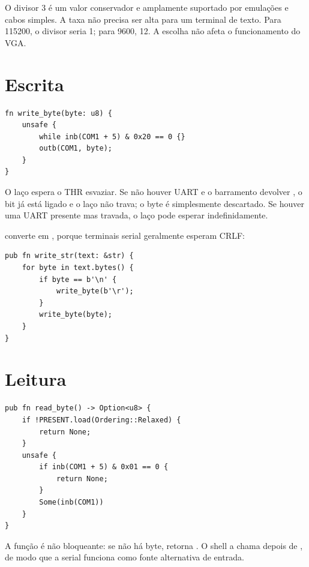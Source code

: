 \begin{nota}
O divisor 3 \'e um valor conservador e amplamente suportado por emula\c{c}\~oes
e cabos simples. A taxa n\~ao precisa ser alta para um terminal de texto.
Para 115200, o divisor seria 1; para 9600, 12. A escolha n\~ao afeta o
funcionamento do VGA.
\end{nota}

\section{Escrita}

\begin{lstlisting}[caption={Envio de um byte pela UART.},label={lst:uartwrite}]
fn write_byte(byte: u8) {
    unsafe {
        while inb(COM1 + 5) & 0x20 == 0 {}
        outb(COM1, byte);
    }
}
\end{lstlisting}

O la\c{c}o espera o THR esvaziar. Se n\~ao houver UART e o barramento devolver
, o bit  j\'a est\'a ligado e o la\c{c}o n\~ao trava;
o byte \'e simplesmente descartado. Se houver uma UART presente mas
travada, o la\c{c}o pode esperar indefinidamente.

 converte  em , porque terminais serial geralmente esperam CRLF:

\begin{lstlisting}[caption={Escrita de string com convers\~ao de nova linha.},label={lst:uartstr}]
pub fn write_str(text: &str) {
    for byte in text.bytes() {
        if byte == b'\n' {
            write_byte(b'\r');
        }
        write_byte(byte);
    }
}
\end{lstlisting}

\section{Leitura}

\begin{lstlisting}[caption={Leitura n\~ao bloqueante de um byte.},label={lst:uartread}]
pub fn read_byte() -> Option<u8> {
    if !PRESENT.load(Ordering::Relaxed) {
        return None;
    }
    unsafe {
        if inb(COM1 + 5) & 0x01 == 0 {
            return None;
        }
        Some(inb(COM1))
    }
}
\end{lstlisting}

A fun\c{c}\~ao \'e n\~ao bloqueante: se n\~ao h\'a byte, retorna .
O shell a chama depois de , de modo que a
serial funciona como fonte alternativa de entrada.

